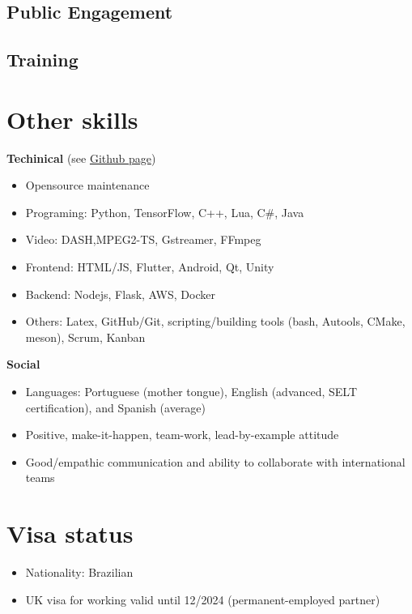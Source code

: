 \documentclass[10pt,a4paper,sans,colorlinks]{moderncv}
\begin{document}
\subsection{Public Engagement}

\subsection{Training}

\section{Other skills}

\textbf{Techinical} (see \href{https://github.com/alanlivio}{Github page})
  \begin{itemize}[mynosep]
    \item Opensource maintenance
    \item Programing: Python, TensorFlow, C++, Lua, C\#, Java
    \item Video: DASH,MPEG2-TS, Gstreamer, FFmpeg
    \item Frontend: HTML/JS, Flutter, Android, Qt, Unity
    \item Backend: Nodejs, Flask, AWS, Docker
    \item Others: Latex, GitHub/Git, scripting/building tools (bash, Autools, CMake, meson), Scrum, Kanban
  \end{itemize}

\textbf{Social}
  \begin{itemize}[mynosep]
    \item Languages: Portuguese (mother tongue), English (advanced, SELT certification), and Spanish (average)
    \item Positive, make-it-happen, team-work, lead-by-example attitude
    \item Good/empathic communication and ability to collaborate with international teams
  \end{itemize}

\section{Visa status}
  \begin{itemize}[mynosep]
    \item Nationality: Brazilian
    \item UK visa for working valid until 12/2024 (permanent-employed partner)
  \end{itemize}
\end{document}
